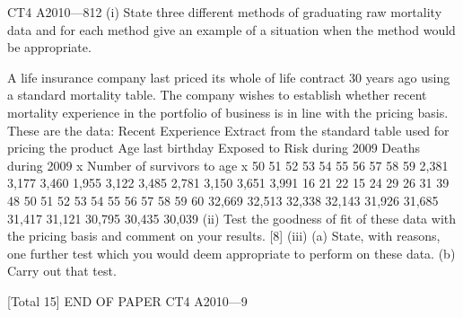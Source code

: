 CT4 A2010—812
(i)
State three different methods of graduating raw mortality data and
for each method give an example of a situation when the method would be
appropriate.
 
A life insurance company last priced its whole of life contract 30 years ago using a
standard mortality table. The company wishes to establish whether recent mortality
experience in the portfolio of business is in line with the pricing basis. These are the
data:
Recent Experience
Extract from the standard table
used for pricing the product
Age last
birthday Exposed to
Risk during
2009 Deaths during
2009 x Number of
survivors to age
x
50
51
52
53
54
55
56
57
58
59 2,381
3,177
3,460
1,955
3,122
3,485
2,781
3,150
3,651
3,991 16
21
22
15
24
29
26
31
39
48 50
51
52
53
54
55
56
57
58
59
60 32,669
32,513
32,338
32,143
31,926
31,685
31,417
31,121
30,795
30,435
30,039
(ii) Test the goodness of fit of these data with the pricing basis and comment on
your results.
[8]
(iii) (a)
State, with reasons, one further test which you would deem appropriate
to perform on these data.
(b)
Carry out that test.

[Total 15]
END OF PAPER
CT4 A2010—9


